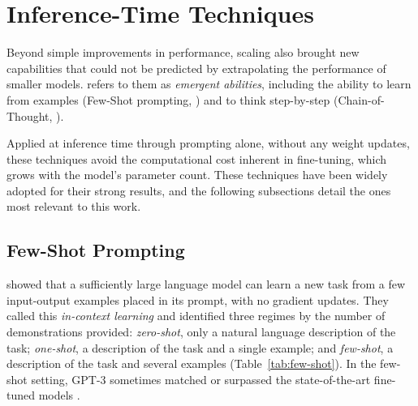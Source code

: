 \section{Inference-Time Techniques} \label{sec:single-agent}

Beyond simple improvements in performance, scaling also brought new capabilities that could not be predicted by extrapolating the performance of smaller models. \textcite{wei2022emergentabilitieslargelanguage} refers to them as \textit{emergent abilities}, including the ability to learn from examples (Few-Shot prompting, \cite{NEURIPS2020_1457c0d6}) and to think step-by-step (Chain-of-Thought, \cite{wei_chain--thought_2023}). 

Applied at inference time through prompting alone, without any weight updates, these techniques avoid the computational cost inherent in fine-tuning, which grows with the model's parameter count. These techniques have been widely adopted for their strong results, and the following subsections detail the ones most relevant to this work.

\subsection{Few-Shot Prompting} \label{sec:few-shot}

\textcite{NEURIPS2020_1457c0d6} showed that a sufficiently large language model can learn a new task from a few input-output examples placed in its prompt, with no gradient updates. They called this \textit{in-context learning} and identified three regimes by the number of demonstrations provided: \textit{zero-shot}, only a natural language description of the task; \textit{one-shot}, a description of the task and a single example; and \textit{few-shot}, a description of the task and several examples (Table~\ref{tab:few-shot}). In the few-shot setting, GPT-3 sometimes matched or surpassed the state-of-the-art fine-tuned models \parencite{NEURIPS2020_1457c0d6}. 


